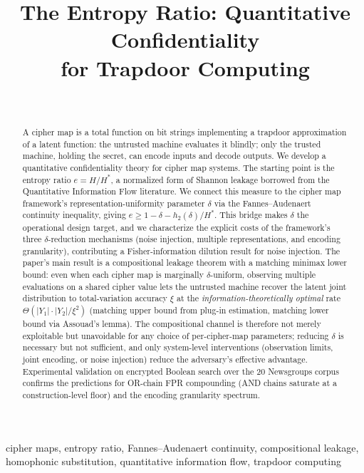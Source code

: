 \documentclass[conference]{IEEEtran}
\title{The Entropy Ratio: Quantitative Confidentiality\\for Trapdoor Computing}
\author{\IEEEauthorblockN{Anonymous Author(s)}\\
\IEEEauthorblockA{Paper submitted for double-blind review}}
\theoremstyle{definition}
\theoremstyle{plain}
\theoremstyle{remark}
\begin{document}
\maketitle

\begin{abstract}
A cipher map is a total function on bit strings implementing a trapdoor
approximation of a latent function: the untrusted machine evaluates it
blindly; only the trusted machine, holding the secret, can encode inputs
and decode outputs.  We develop a quantitative confidentiality theory
for cipher map systems.  The starting point is the entropy ratio
$e = H/H^*$, a normalized form of Shannon leakage borrowed from the
Quantitative Information Flow literature.  We connect this measure to
the cipher map framework's representation-uniformity parameter $\delta$
via the Fannes--Audenaert continuity inequality, giving
$e \geq 1 - \delta - h_2(\delta)/H^*$.  This bridge makes $\delta$ the
operational design target, and we characterize the explicit costs of
the framework's three $\delta$-reduction mechanisms (noise injection,
multiple representations, and encoding granularity), contributing a
Fisher-information dilution result for noise injection.  The paper's
main result is a compositional
leakage theorem with a matching minimax lower bound: even when each
cipher map is marginally $\delta$-uniform, observing multiple
evaluations on a shared cipher value lets the untrusted machine
recover the latent joint distribution to total-variation accuracy
$\xi$ at the \emph{information-theoretically optimal} rate
$\Theta(|Y_1|\cdot|Y_2|/\xi^2)$ (matching upper bound from plug-in
estimation, matching lower bound via Assouad's lemma).  The
compositional channel is therefore not merely exploitable but
unavoidable for any choice of per-cipher-map parameters; reducing
$\delta$ is necessary but not sufficient, and only system-level
interventions (observation limits, joint encoding, or noise
injection) reduce the adversary's effective advantage.  Experimental
validation on encrypted Boolean search over the 20 Newsgroups corpus
confirms the predictions for OR-chain FPR compounding (AND chains
saturate at a construction-level floor) and the encoding granularity
spectrum.
\end{abstract}

\begin{IEEEkeywords}
cipher maps, entropy ratio, Fannes--Audenaert continuity, compositional
leakage, homophonic substitution, quantitative information flow,
trapdoor computing
\end{IEEEkeywords}
\end{document}
